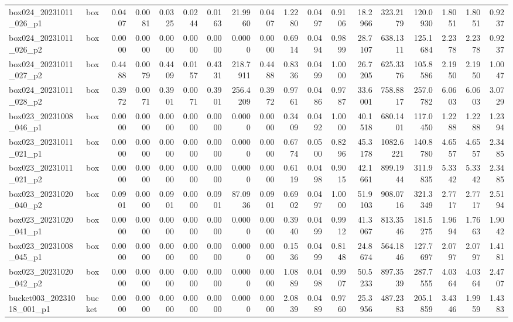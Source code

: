 \begin{table}[t]
{\begin{tabular}{l l r r r r r r r r r r r r r r r r }
box024\_20231011\_026\_p1 & box & 0.0407 & 0.0081 & 0.0325 & 0.0244 & 0.0163 & 21.9960 & 0.0407 & 1.2280 & 0.0497 & 0.9106 & 18.2966 & 323.2179 & 120.0930 & 1.8051 & 1.8051 & 0.9237 \\
box024\_20231011\_026\_p2 & box & 0.0000 & 0.0000 & 0.0000 & 0.0000 & 0.0000 & 0.0000 & 0.0000 & 0.6914 & 0.0494 & 0.9899 & 28.7107 & 638.1311 & 125.1684 & 2.2378 & 2.2378 & 0.9237 \\
box024\_20231011\_027\_p2 & box & 0.4488 & 0.0079 & 0.4409 & 0.0157 & 0.4331 & 218.7911 & 0.4488 & 0.8336 & 0.0499 & 1.0000 & 26.7205 & 625.3376 & 105.8586 & 2.1950 & 2.1950 & 1.0047 \\
box024\_20231011\_028\_p2 & box & 0.3972 & 0.0071 & 0.3901 & 0.0071 & 0.3901 & 256.4209 & 0.3972 & 0.9761 & 0.0486 & 0.9787 & 33.6001 & 758.8817 & 257.0782 & 6.0603 & 6.0603 & 3.0729 \\
box023\_20231008\_046\_p1 & box & 0.0000 & 0.0000 & 0.0000 & 0.0000 & 0.0000 & 0.0000 & 0.0000 & 0.3409 & 0.0492 & 1.0000 & 40.1518 & 680.1401 & 117.0450 & 1.2288 & 1.2288 & 1.2394 \\
box023\_20231011\_021\_p1 & box & 0.0000 & 0.0000 & 0.0000 & 0.0000 & 0.0000 & 0.0000 & 0.0000 & 0.6774 & 0.0500 & 0.8296 & 45.3178 & 1082.6221 & 140.8780 & 4.6557 & 4.6557 & 2.3485 \\
box023\_20231011\_021\_p2 & box & 0.0000 & 0.0000 & 0.0000 & 0.0000 & 0.0000 & 0.0000 & 0.0000 & 0.6119 & 0.0498 & 0.9015 & 42.1661 & 899.1944 & 311.9835 & 5.3342 & 5.3342 & 2.3485 \\
box023\_20231020\_040\_p2 & box & 0.0901 & 0.0000 & 0.0901 & 0.0000 & 0.0901 & 87.0936 & 0.0901 & 0.6902 & 0.0497 & 1.0000 & 51.9103 & 908.0716 & 321.3349 & 2.7717 & 2.7717 & 2.5194 \\
box023\_20231020\_041\_p1 & box & 0.0000 & 0.0000 & 0.0000 & 0.0000 & 0.0000 & 0.0000 & 0.0000 & 0.3940 & 0.0499 & 0.9912 & 41.3067 & 813.3546 & 181.5275 & 1.9694 & 1.7663 & 1.9042 \\
box023\_20231008\_045\_p1 & box & 0.0000 & 0.0000 & 0.0000 & 0.0000 & 0.0000 & 0.0000 & 0.0000 & 0.1536 & 0.0499 & 0.8148 & 24.8674 & 564.1846 & 127.7697 & 2.0797 & 2.0797 & 1.4181 \\
box023\_20231020\_042\_p2 & box & 0.0000 & 0.0000 & 0.0000 & 0.0000 & 0.0000 & 0.0000 & 0.0000 & 1.0889 & 0.0498 & 0.9907 & 50.5233 & 897.3539 & 287.7555 & 4.0364 & 4.0364 & 2.4707 \\
bucket003\_20231018\_001\_p1 & bucket & 0.0000 & 0.0000 & 0.0000 & 0.0000 & 0.0000 & 0.0000 & 0.0000 & 2.0839 & 0.0489 & 0.9760 & 25.3956 & 487.2383 & 205.1859 & 3.4346 & 1.9959 & 1.4383 \\

\end{tabular}}
\end{table}
